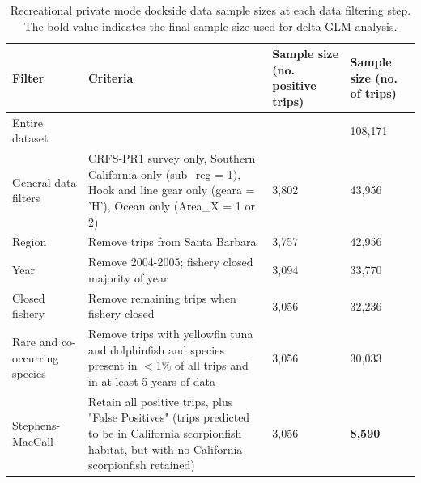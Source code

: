\documentclass[12pt,]{article}
\begin{document}
\FloatBarrier

\begin{table}[ht]
\centering
\caption{Recreational private mode dockside data sample 
                                          sizes at each data filtering step.  
                                          The bold value indicates the final sample size 
                                          used for delta-GLM analysis.} 
\label{tab:Fleet4_RecPR_dockside_filter}
\begin{tabular}{>{\raggedright}p{1.5in}>{\raggedright}p{2.6in}>{\raggedright}p{1in}>{\raggedright}p{1in}}
  \hline
Filter & Criteria & Sample size (no. positive trips) & Sample size (no. of trips) \\ 
  \hline
Entire dataset &  &  & 108,171 \\ 
  General data filters & CRFS-PR1 survey only, Southern California only (sub\_reg = 1), Hook and line gear only (geara = 'H'), Ocean only (Area\_X = 1 or 2) & 3,802 & 43,956 \\ 
  Region & Remove trips from Santa Barbara & 3,757 & 42,956 \\ 
  Year & Remove 2004-2005; fishery closed majority of year & 3,094 & 33,770 \\ 
  Closed fishery & Remove remaining trips when fishery closed & 3,056 & 32,236 \\ 
  Rare and co-occurring species & Remove trips with yellowfin tuna and dolphinfish and species present in $<$1\% of all trips and in at least 5 years of data & 3,056 & 30,033 \\ 
  Stephens-MacCall & Retain all positive trips, plus "False Positives" (trips predicted to be in California scorpionfish habitat, but with no California scorpionfish retained) & 3,056 & \textbf{8,590} \\ 
   \hline
\end{tabular}
\end{table}\vspace{2in}
\end{document}
